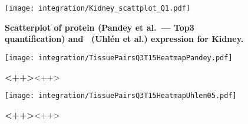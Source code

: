 \pagestyle{scrheadings}


\begin{figure}[!htpb]
    \texttt{[image: integration/Kidney\_scattplot\_Q1.pdf]}\centering
    \caption[Scatterplot of protein (Pandey et al.\ --- Top3 quantification)
    and \mRNA\ (Uhlén et al.) expression for Kidney]{\label{fig:ScatKidQ1}%
    \textbf{Scatterplot of protein (Pandey et al.\ --- Top3 quantification)
    and \mRNA\ (Uhlén et al.) expression for Kidney.}}
\end{figure}




\begin{figure}[!htb]
    \texttt{[image: integration/TissuePairsQ3T15HeatmapPandey.pdf]}\centering
    \caption[Heatmap]{\label{fig:heatmapPandeyTissuePairs}\textbf{<++>}<++>}
\end{figure}

\begin{figure}[!htb]
    \texttt{[image: integration/TissuePairsQ3T15HeatmapUhlen05.pdf]}\centering
    \caption[Heatmap]{\label{fig:heatmapUhlenTissuePairs05}\textbf{<++>}<++>}
\end{figure}















\clearpage



\normalsize


\pagestyle{scrheadings}


